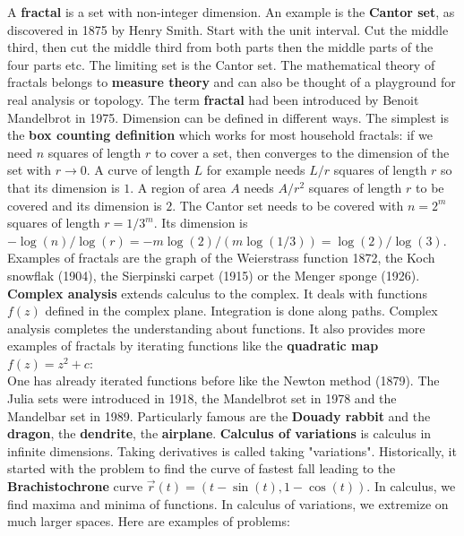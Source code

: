 \documentclass[12pt]{amsart}
\newcounter{example}    \def\example#1{ \item \fontsize{12}{15} \selectfont #1 \fontsize{12}{15} \selectfont }
\begin{document}
A {\bf fractal} is a set with non-integer dimension. An example is
the {\bf Cantor set}, as discovered in 1875 by Henry Smith. 
Start with the unit interval. Cut the middle third, then cut the middle third 
from both parts then the middle parts of the four parts etc. The limiting set is the Cantor set.
The mathematical theory of fractals belongs to {\bf measure theory} and can also 
be thought of a playground for real analysis or topology. The term {\bf fractal} had been introduced 
by Benoit Mandelbrot in 1975. Dimension can be defined in different ways. The simplest is the
{\bf box counting definition} which works for most household fractals: if  we need $n$ squares of 
length $r$ to cover a set, then 
 converges to the dimension of the set with 
$r \to 0$. A curve of length $L$ for example needs
$L/r$ squares of length $r$ so that its dimension is $1$. 
A region of area $A$ needs $A/r^2$ squares of length $r$ to be covered 
and its dimension is $2$. The Cantor set needs to be covered with 
$n=2^m$ squares of length $r=1/3^m$. Its dimension is 
$-\log(n)/\log(r) = - m \log(2)/(m \log(1/3)) = \log(2)/\log(3)$. 
Examples of fractals are the graph of the Weierstrass function 1872, 
the Koch snowflak (1904), the Sierpinski carpet (1915) or
the Menger sponge  (1926). \\
{\bf Complex analysis} extends calculus to the complex. It deals with functions $f(z)$ defined
in the complex plane. Integration is done along paths. Complex analysis completes the
understanding about functions. It also provides more examples of fractals by iterating functions 
like the {\bf quadratic map} $f(z) = z^2+c$:  \\
One has already iterated functions before like the Newton method (1879). The
Julia sets were introduced in 1918, the Mandelbrot set   in 1978 and the
Mandelbar set     in 1989.
Particularly famous are the {\bf Douady rabbit} and the {\bf dragon}, the {\bf dendrite}, the {\bf airplane}. 
{\bf Calculus of variations} is calculus in infinite dimensions. Taking derivatives is called taking "variations". 
Historically, it started with the problem to find the curve of fastest fall leading to the 
{\bf Brachistochrone} curve $\vec{r}(t) = (t-\sin(t),1-\cos(t))$. 
In calculus, we find maxima and minima of functions. In calculus of variations, we extremize on much
larger spaces. Here are examples of problems: 

\parbox{16.8cm}{
\parbox{6cm}{
}}
\end{document}
